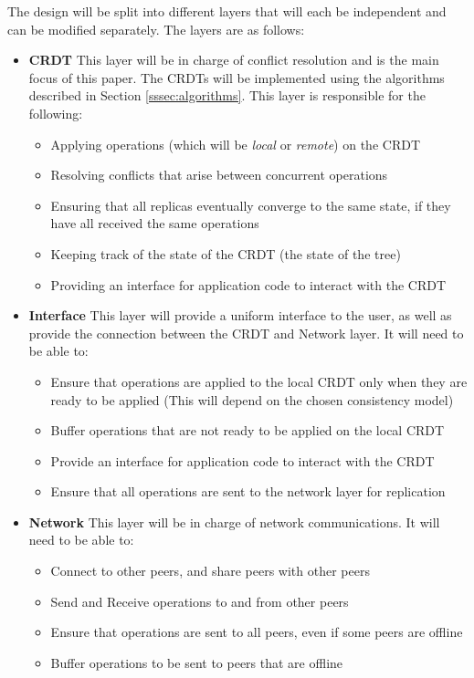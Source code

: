 \documentclass[12pt]{report}
\begin{document}
The design will be split into different layers that will each be independent and can be modified separately. The layers are as follows:
\begin{itemize}
    \item \textbf{CRDT} This layer will be in charge of conflict resolution and is the main focus of this paper. The CRDTs will be implemented using the algorithms described in Section \ref{sssec:algorithms}. This layer is responsible for the following: 
        \begin{itemize}
            \item Applying operations (which will be \textit{local} or \textit{remote}) on the CRDT
            \item Resolving conflicts that arise between concurrent operations 
            \item Ensuring that all replicas eventually converge to the same state, if they have all received the same operations
            \item Keeping track of the state of the CRDT (the state of the tree)
            \item Providing an interface for application code to interact with the CRDT
        \end{itemize}

    \item \textbf{Interface} This layer will provide a uniform interface to the user, as well as provide the connection between the CRDT and Network layer. It will need to be able to:
        \begin{itemize}
            \item Ensure that operations are applied to the local CRDT only when they are ready to be applied (This will depend on the chosen consistency model)
            \item Buffer operations that are not ready to be applied on the local CRDT
            \item Provide an interface for application code to interact with the CRDT
            \item Ensure that all operations are sent to the network layer for replication
        \end{itemize}
    \item \textbf{Network} This layer will be in charge of network communications. It will need to be able to:
        \begin{itemize}
            \item Connect to other peers, and share peers with other peers
            \item Send and Receive operations to and from other peers
            \item Ensure that operations are sent to all peers, even if some peers are offline
            \item Buffer operations to be sent to peers that are offline
        \end{itemize}
\end{itemize}
\end{document}
